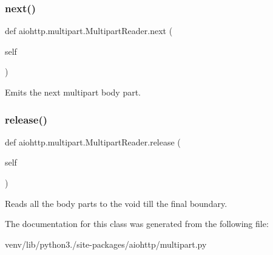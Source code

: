 \subsubsection{\texorpdfstring{next()}{next()}}
{\footnotesize\ttfamily def aiohttp.\+multipart.\+Multipart\+Reader.\+next (\begin{DoxyParamCaption}\item[{}]{self }\end{DoxyParamCaption})}

\begin{DoxyVerb}Emits the next multipart body part.\end{DoxyVerb}
 \mbox{\label{classaiohttp_1_1multipart_1_1_multipart_reader_ad42d61b96afe9308b45609f5bd208dc7}} 
\subsubsection{\texorpdfstring{release()}{release()}}
{\footnotesize\ttfamily def aiohttp.\+multipart.\+Multipart\+Reader.\+release (\begin{DoxyParamCaption}\item[{}]{self }\end{DoxyParamCaption})}

\begin{DoxyVerb}Reads all the body parts to the void till the final boundary.\end{DoxyVerb}
 

The documentation for this class was generated from the following file\+:\begin{DoxyCompactItemize}
\item 
venv/lib/python3./site-\/packages/aiohttp/multipart.\+py\end{DoxyCompactItemize}
